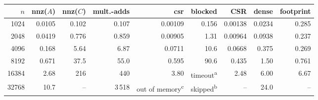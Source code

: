 \begin{tabular}{rrrrrrrrr}
\toprule
$n$ & nnz($A$) & nnz($C$) & mult.-adds & csr & blocked & CSR & dense & footprint \\
\midrule
1024 & 0.0105 & 0.102 & 0.107 & 0.00109 & 0.156 & 0.00138 & 0.0234 & 0.285 \\
2048 & 0.0419 & 0.776 & 0.859 & 0.00905 & 1.31 & 0.00964 & 0.0938 & 0.237 \\
4096 & 0.168 & 5.64 & 6.87 & 0.0711 & 10.6 & 0.0668 & 0.375 & 0.269 \\
8192 & 0.671 & 37.5 & 55.0 & 0.595 & 90.6 & 0.435 & 1.50 & 0.761 \\
16384 & 2.68 & 216 & 440 & 3.80 & timeout\textsuperscript{a} & 2.48 & 6.00 & 6.67 \\
32768 & 10.7 & -- & 3\,518 & out of memory\textsuperscript{c} & skipped\textsuperscript{b} & -- & 24.0 & -- \\
\bottomrule
\end{tabular}
\par{}
